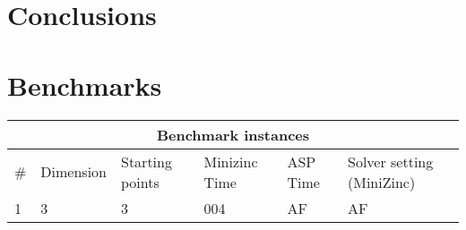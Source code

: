 \section{Conclusions}
\section{Benchmarks}\label{sec:benchmarks}

\begin{tabular}{ |p{0.5cm}||p{2cm}|p{2cm}||p{2cm}|p{2cm}||p{2cm}|  }
    \hline
    \multicolumn{6}{|c|}{Benchmark instances} \\
    \hline
    \# &Dimension &Starting points &Minizinc Time &ASP Time &Solver setting (MiniZinc)\\
    \hline
    1 &3 &3 &004 &AF &AF\\
    \hline
   \end{tabular}